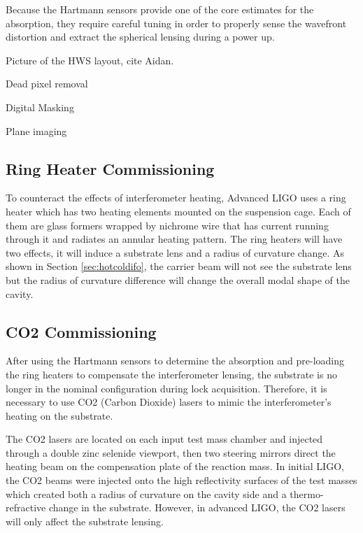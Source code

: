 	Because the Hartmann sensors provide one of the core estimates for the absorption, they require careful tuning in order to properly sense the wavefront distortion and extract the spherical lensing during a power up.
	
	Picture of the HWS layout, cite Aidan.
	
	Dead pixel removal
	
	Digital Masking
	
	Plane imaging
	\cite{AWC_current}
	
	\cite{Brooks_OffAxis}
	
	\cite{Veitch_HWS_ALIGO}
	
	\cite{Brooks_HWS_2009}
	
	\cite{Brooks_HWS_2007}
	
	\subsection{Ring Heater Commissioning}\label{Sec:RH}
	To counteract the effects of interferometer heating, Advanced LIGO uses a ring heater which has two heating elements mounted on the suspension cage. Each of them are glass formers wrapped by nichrome wire that has current running through it and radiates an annular heating pattern. The ring heaters will have two effects, it will induce a substrate lens and a radius of curvature change.  As shown in Section \ref{sec:hotcoldifo}, the carrier beam will not see the substrate lens but the radius of curvature difference will change the overall modal shape of the cavity. 
	
	\cite{ramette_analytical}
	
	\cite{wang_thermalmodel}
	
	\cite{winkler_thermaldist}
	
	
	\subsection{CO2 Commissioning}\label{Sec:CO2}
	After using the Hartmann sensors to determine the absorption and pre-loading the ring heaters to compensate the interferometer lensing, the substrate is no longer in the nominal configuration during lock acquisition.  Therefore, it is necessary to use CO2 (Carbon Dioxide) lasers to mimic the interferometer's heating on the substrate.
	
	The CO2 lasers are located on each input test mass chamber and injected through a double zinc selenide viewport, then two steering mirrors direct the heating beam on the compensation plate of the reaction mass.  In initial LIGO, the CO2 beams were injected onto the high reflectivity surfaces of the test masses which created both a radius of curvature on the cavity side and a thermo-refractive change in the substrate.  However, in advanced LIGO, the CO2 lasers will only affect the substrate lensing.
	
